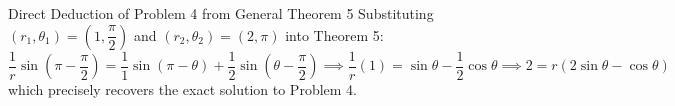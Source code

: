 \documentclass[11pt,a4paper]{article}
\begin{document}
\vspace{3mm}
\begin{remarkbox}{Direct Deduction of Problem 4 from General Theorem 5}
Substituting $(r_1, \theta_1) = \left(1, \dfrac{\pi}{2}\right)$ and $(r_2, \theta_2) = (2, \pi)$ into Theorem 5:
\[
\frac{1}{r}\sin\left(\pi - \frac{\pi}{2}\right) = \frac{1}{1}\sin(\pi - \theta) + \frac{1}{2}\sin\left(\theta - \frac{\pi}{2}\right) \implies \frac{1}{r}(1) = \sin\theta - \frac{1}{2}\cos\theta \implies 2 = r(2\sin\theta - \cos\theta)
\]
which precisely recovers the exact solution to Problem 4.
\end{remarkbox}
\end{document}
